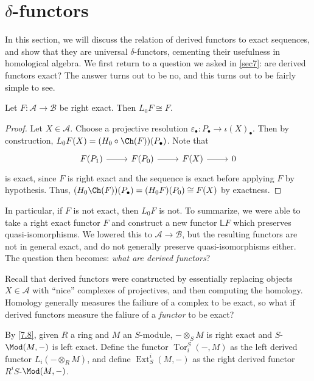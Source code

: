 \section{$\delta $-functors}\label{sec8}

In this section, we will discuss the relation of derived functors to exact sequences, and show that they are universal $\delta $-functors, cementing their usefulness in homological algebra. We first return to a question we asked in \cref{sec7}: are derived functors exact? The answer turns out to be no, and this turns out to be fairly simple to see.

\begin{proposition}\label{8.1}
	Let $F : \mathcal{A}  \to \mathcal{B} $ be right exact. Then $L_0F \cong F$.
\end{proposition}
\begin{proof}
	Let $X\in \mathcal{A} $. Choose a projective resolution $\varepsilon _{\bullet} : P_{\bullet}  \to \iota (X)_{\bullet} $. Then by construction, $L_0F(X)=(H_0 \circ \Ch(F) )(P_{\bullet} )$. Note that
	\[\begin{tikzcd}[row sep = 2.5em, column sep = 2.5em]
	F(P_1)\ar[r]  & F(P_0)\ar[r]  & F(X)\ar[r]  & 0 
	\end{tikzcd}\]
	is exact, since $F$ is right exact and the sequence is exact before applying $F$ by hypothesis. Thus, $(H_0 \Ch(F) )(P_{\bullet} )=(H_0F)(P_0)\cong F(X)$ by exactness.
\end{proof}

In particular, if $F$ is not exact, then $L_0F$ is not. To summarize, we were able to take a right exact functor $F$ and construct a new functor $\mathbb{L} F$ which preserves quasi-isomorphisms. We lowered this to $\mathcal{A} \to \mathcal{B} $, but the resulting functors are not in general exact, and do not generally preserve quasi-isomorphisms either. The question then becomes: \emph{what are derived functors}?

Recall that derived functors were constructed by essentially replacing objects $X\in \mathcal{A} $ with ``nice'' complexes of projectives, and then computing the homology. Homology generally measures the failiure of a complex to be exact, so what if derived functors measure the faliure of a \emph{functor} to be exact?













\begin{definition}\label{8.?}
	By \cref{7.8}, given $R$ a ring and $M$ an $S$-module, $-\otimes _SM$ is right exact and $S$-$\Mod(M,-)$ is left exact. Define the functor $\operatorname{Tor}^S_i(-,M)$ as the left derived functor $L_i(-\otimes _RM)$, and define $\operatorname{Ext}_S^i(M,-)$ as the right derived functor $R^iS$-$\Mod(M,-)$.
\end{definition}
